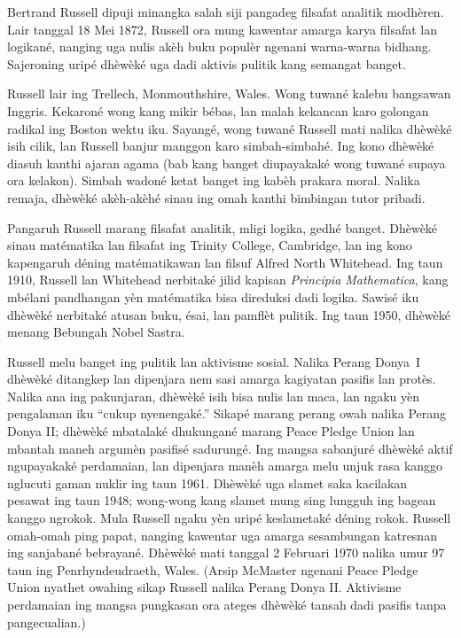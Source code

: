 \documentclass[../../../include/open-logic-section]{subfiles}
\begin{document}



Bertrand Russell dipuji minangka salah siji pangadeg
filsafat analitik modhèren. Lair tanggal 18 Mei
1872, Russell ora mung kawentar amarga karya
filsafat lan logikané, nanging uga nulis akèh
buku populèr ngenani warna-warna bidhang.
Sajeroning uripé dhèwèké uga dadi aktivis
pulitik kang semangat banget.

Russell lair ing Trellech, Monmouthshire,
Wales. Wong tuwané kalebu bangsawan Inggris.
Kekaroné wong kang mikir bébas, lan malah
kekancan karo golongan radikal ing Boston
wektu iku. Sayangé, wong tuwané Russell
mati nalika dhèwèké isih cilik, lan
Russell banjur manggon karo simbah-simbahé.
Ing kono dhèwèké diasuh kanthi ajaran
agama (bab kang banget diupayakaké wong
tuwané supaya ora kelakon). Simbah
wadoné ketat banget ing kabèh prakara
moral. Nalika remaja, dhèwèké akèh-akèhé
sinau ing omah kanthi bimbingan tutor
pribadi.

Pangaruh Russell marang filsafat analitik,
mligi logika, gedhé banget. Dhèwèké
sinau matématika lan filsafat ing Trinity
College, Cambridge, lan ing kono kapengaruh
déning matématikawan lan filsuf Alfred
North Whitehead. Ing taun 1910, Russell
lan Whitehead nerbitaké jilid kapisan
\emph{Principia Mathematica}, kang mbélani
pandhangan yèn matématika bisa direduksi
dadi logika. Sawisé iku dhèwèké nerbitaké
atusan buku, ésai, lan pamflèt pulitik.
Ing taun 1950, dhèwèké menang
Bebungah Nobel Sastra.

Russell melu banget ing pulitik lan
aktivisme sosial. Nalika Perang Donya~I
dhèwèké ditangkep lan dipenjara nem
sasi amarga kagiyatan pasifis lan protès.
Nalika ana ing pakunjaran, dhèwèké
isih bisa nulis lan maca, lan ngaku
yèn pengalaman iku ``cukup nyenengaké.''
Sikapé marang perang owah nalika
Perang Donya II; dhèwèké mbatalaké dhukungané
marang Peace Pledge Union lan mbantah maneh
argumèn pasifisé sadurungé. Ing mangsa sabanjuré
dhèwèké aktif ngupayakaké perdamaian, lan
dipenjara manèh amarga
melu unjuk rasa kanggo nglucuti
gaman nuklir ing taun 1961. Dhèwèké
uga slamet saka kacilakan pesawat
ing taun 1948; wong-wong kang
slamet mung sing lungguh ing
bagean kanggo ngrokok. Mula Russell
ngaku yèn uripé keslametaké
déning rokok. Russell omah-omah
ping papat, nanging kawentar uga
amarga sesambungan katresnan ing
sanjabané bebrayané. Dhèwèké
mati tanggal 2 Februari 1970
nalika umur 97 taun ing
Penrhyndeudraeth, Wales.
(Arsip McMaster ngenani Peace Pledge Union nyathet owahing sikap Russell nalika Perang Donya II. Aktivisme perdamaian ing mangsa pungkasan ora ateges dhèwèké tansah dadi pasifis tanpa pangecualian.)
\end{document}

